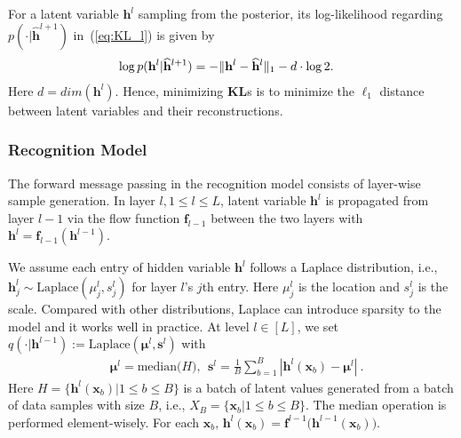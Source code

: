 \documentclass{article}
\begin{document}
For a latent variable  $\mathbf{h}^l$ sampling from the posterior, its log-likelihood regarding $p(\cdot | \widehat{\mathbf{h}}^{l+1})$ in~(\ref{eq:KL_l}) is given by 
\begin{align} \notag
& \log p(\mathbf{h}^l | \widehat{\mathbf{h}}^{l+1}) = -\|\mathbf{h}^l- \widehat{\mathbf{h}}^l\|_1 -d\cdot\log2  .
\end{align}
Here $d = dim(\mathbf{h}^l)$. Hence, minimizing  $\mathbf{KL}$s is to minimize the $\ell_1$ distance between latent variables and their reconstructions. 


\subsubsection{Recognition Model}
The forward message passing in the recognition model consists of  layer-wise sample generation. In layer $l, 1 \leq l \leq L$, latent variable $\mathbf{h}^{l}$ is propagated   from layer $l-1$ via the flow function $\mathbf{f}_{l-1}$ between the two layers with $\mathbf{h}^{l}= \mathbf{f}_{l-1}(\mathbf{h}^{l-1})$. 

 We assume each entry of  hidden variable $\mathbf{h}^{l}$ follows a Laplace distribution, i.e., $\mathbf{h}_j^{l} \sim \text{Laplace}(\mu_j^{l}, s_j^{l})$ for layer $l$'s $j$th entry. Here $\mu_j^{l}$ is the location and $s_j^{l}$ is the scale. Compared with other distributions, Laplace can introduce sparsity to the model and it works well in practice. At level $l \in [L]$, we set $q(\cdot|\mathbf{h}^{l-1}) := \text{Laplace}(\mathbf{\mu}^l, \mathbf{s}^l)$ with
\begin{align}\label{eq:posteriorapp}
&\mathbf{\mu}^l = \text{median}\big(H\big), \ \  \mathbf{s}^l =\frac{1}{B}\sum_{b=1}^B|\mathbf{h}^l(\mathbf{x}_b) - \mathbf{\mu}^l| \ .
\end{align}
Here $H=\{\mathbf{h}^l(\mathbf{x}_b)| 1\leqslant b \leqslant B\}$ is a batch of latent values generated from a batch of data samples with size $B$, i.e., $X_{B} = \{\mathbf{x}_b | 1\leqslant b \leqslant B\}$. The median operation is performed element-wisely. For each $\mathbf{x}_b$, $\mathbf{h}^l(\mathbf{x}_b)=\mathbf{f}^{l-1}\big(\mathbf{h}^{l-1}(\mathbf{x}_b)\big)$.
\end{document}
